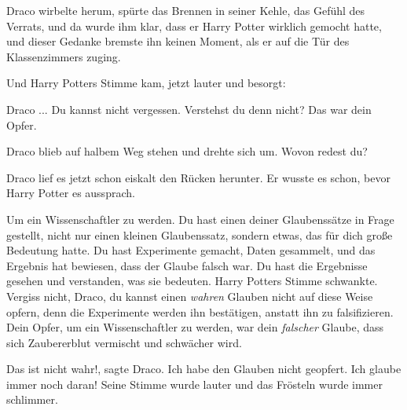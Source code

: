 Draco wirbelte herum, spürte das Brennen in seiner Kehle, das Gefühl des
Verrats, und da wurde ihm klar, dass er Harry Potter wirklich gemocht hatte, und
dieser Gedanke bremste ihn keinen Moment, als er auf die Tür des Klassenzimmers
zuging.

Und Harry Potters Stimme kam, jetzt lauter und besorgt:

\glqq{}Draco ... Du kannst nicht vergessen. Verstehst du denn nicht? Das war dein
Opfer.\grqq{}

Draco blieb auf halbem Weg stehen und drehte sich um. \glqq{}Wovon redest
du?\grqq{}

Draco lief es jetzt schon eiskalt den Rücken herunter. Er wusste es schon, bevor
Harry Potter es aussprach.

\glqq{}Um ein Wissenschaftler zu werden. Du hast einen deiner Glaubenssätze in
Frage gestellt, nicht nur einen kleinen Glaubenssatz, sondern etwas, das für
dich große Bedeutung hatte. Du hast Experimente gemacht, Daten gesammelt, und
das Ergebnis hat bewiesen, dass der Glaube falsch war. Du hast die Ergebnisse
gesehen und verstanden, was sie bedeuten.\grqq{} Harry Potters Stimme schwankte.
\glqq{}Vergiss nicht, Draco, du kannst einen \emph{wahren} Glauben nicht auf
diese Weise opfern, denn die Experimente werden ihn bestätigen, anstatt ihn zu
falsifizieren. Dein Opfer, um ein Wissenschaftler zu werden, war dein
\emph{falscher} Glaube, dass sich Zaubererblut vermischt und schwächer
wird.\grqq{}

\glqq{}Das ist nicht wahr!\grqq{}, sagte Draco. \glqq{}Ich habe den Glauben
nicht geopfert. Ich glaube immer noch daran!\grqq{} Seine Stimme wurde lauter
und das Frösteln wurde immer schlimmer.


